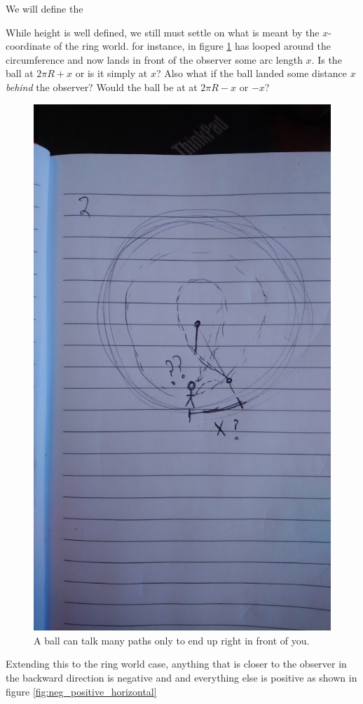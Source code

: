 \documentclass{amsart}
\theoremstyle{definition}
\begin{document}
We will define the 

While height is well defined, we still must settle on what is meant by
the $x$-coordinate of the ring world.  for instance, in figure
\ref{fig:what_is_x} has looped around the circumference and now lands
in front of the observer some arc length $x$.  Is the ball at $2\pi R
+ x$ or is it simply at $x$? Also what if the ball landed some
distance $x$ \textit{behind} the observer?  Would the ball be at at
$2\pi R - x$ or $-x$? \newline

\begin{figure}
	\centering
	\includegraphics[width=0.7\linewidth]{figures/define_horizontal_pos_rough.JPG}
	\caption{A ball can talk many paths only to end up right in front of you.}
	\label{fig:what_is_x}
\end{figure}


Extending this to the ring world case, anything that is closer to the observer in the backward direction is negative and and everything 
else is positive as shown in figure \ref{fig:neg_positive_horizontal}
\end{document}
